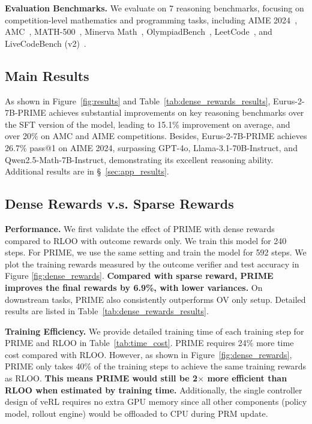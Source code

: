 \textbf{Evaluation Benchmarks.}
We evaluate on 7 reasoning benchmarks, focusing on competition-level mathematics and programming tasks, including AIME 2024~\citep{li2024numinamath}, AMC~\citep{li2024numinamath}, MATH-500~\citep{hendrycks2021measuring}, Minerva Math~\citep{lewkowycz2022solving}, OlympiadBench~\citep{he-etal-2024-olympiadbench}, LeetCode~\citep{guo2024deepseek}, and LiveCodeBench (v2)~\citep{jain2024livecodebench}.




\vspace{-10pt}
\subsection{Main Results}

As shown in Figure~\ref{fig:results} and Table~\ref{tab:dense_rewards_results}, Eurus-2-7B-PRIME achieves substantial improvements on key reasoning benchmarks over the SFT version of the model, leading to 15.1\% improvement on average, and over 20\% on AMC and AIME competitions. Besides, Eurus-2-7B-PRIME achieves 26.7\% pass@1 on AIME 2024, surpassing GPT-4o, Llama-3.1-70B-Instruct, and Qwen2.5-Math-7B-Instruct, demonstrating its excellent reasoning ability. Additional results are in \S~\ref{sec:app_results}.

%
\vspace{-10pt}
\subsection{Dense Rewards v.s. Sparse Rewards}
\textbf{Performance.}
We first validate the effect of PRIME with dense rewards compared to RLOO with outcome rewards only. 
We train this model for 240 steps. For PRIME, we use the same setting and train the model for 592 steps. We plot the training rewards measured by the outcome verifier and test accuracy in Figure \ref{fig:dense_rewards}. \textbf{Compared with sparse reward, PRIME improves the final rewards by 6.9\%, with lower variances.} On downstream tasks, PRIME also consistently outperforms OV only setup. Detailed results are listed in Table~\ref{tab:dense_rewards_results}.



\textbf{Training Efficiency.}
We provide detailed training time of each training step for PRIME and RLOO in Table~\ref{tab:time_cost}. PRIME requires 24$\%$ more time cost compared with RLOO. However, as shown in Figure~\ref{fig:dense_rewards}, PRIME only takes 40\% of the training steps to achieve the same training rewards as RLOO. 
\textbf{This means PRIME would still be 2$\times$ more efficient than RLOO when estimated by training time.} 
Additionally, the single controller design of veRL requires no extra GPU memory since all other components (policy model, rollout engine) would be offloaded to CPU during PRM update. %

